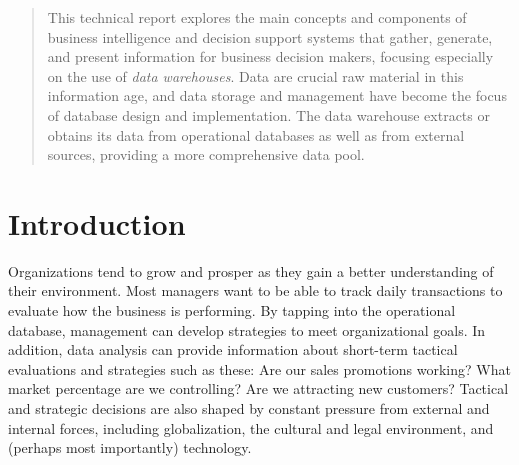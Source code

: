 \documentclass{vldb}
\begin{document}


\maketitle

\begin{abstract}
This technical report explores the main concepts and components of business intelligence and
decision support systems that gather, generate, and present information for business
decision makers, focusing especially on the use of \textit{data warehouses}.
Data are crucial raw material in this information age, and data storage and management have
become the focus of database design and implementation.
The data warehouse extracts or obtains its
data from operational databases as well as from external sources, providing a more
comprehensive data pool.
\end{abstract}

\section{Introduction}


Organizations tend to grow and prosper as they gain a better understanding of their environment. Most managers want
to be able to track daily transactions to evaluate how the business is performing. By tapping into the operational
database, management can develop strategies to meet organizational goals. In addition, data analysis can provide
information about short-term tactical evaluations and strategies such as these: Are our sales promotions working? What
market percentage are we controlling? Are we attracting new customers? Tactical and strategic decisions are also
shaped by constant pressure from external and internal forces, including globalization, the cultural and legal
environment, and (perhaps most importantly) technology.
\end{document}
